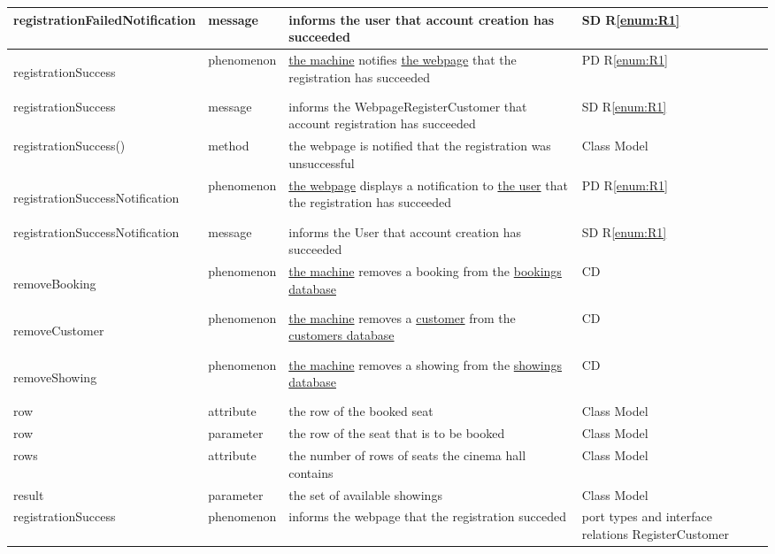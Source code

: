 \documentclass[a4paper,10pt,titlepage,bibtotoc,bibtotocnumbered]{scrreprt}
\begin{document}
\begin{longtable}{|p{.4\linewidth}|p{.2\linewidth}|p{.2\linewidth}|p{.2\linewidth}|}
\hline
registrationFailedNotification & message & informs the user that account creation has succeeded & SD R\ref{enum:R1}\\
\hline
\hypertarget{glossary:registrationSuccess}{registrationSuccess} & phenomenon & \hyperlink{glossary:UDEKino}{the machine} notifies \hyperlink{glossary:WebpageRegisterCustomer}{the webpage} that the registration has succeeded & PD R\ref{enum:R1}\\
\hline
registrationSuccess & message & informs the WebpageRegisterCustomer that account registration has succeeded & SD R\ref{enum:R1}\\
\hline
registrationSuccess() & method & the webpage is notified that the registration was unsuccessful & Class Model\\
\hline
\hypertarget{glossary:registrationSuccessNotification}{registrationSuccessNotification} & phenomenon & \hyperlink{glossary:WebpageRegisterCustomer}{the webpage} displays a notification to \hyperlink{glossary:User}{the user} that the registration has succeeded & PD R\ref{enum:R1}\\
\hline
registrationSuccessNotification & message & informs the User that account creation has succeeded & SD R\ref{enum:R1}\\
\hline
\hypertarget{glossary:removeBooking}{removeBooking} & phenomenon &  \hyperlink{glossary:UDEKino}{the machine} removes a booking from the \hyperlink{glossary:Booking}{bookings database} & CD\\
\hline
\hypertarget{glossary:removeBooking}{removeCustomer} & phenomenon &  \hyperlink{glossary:UDEKino}{the machine} removes a \hyperlink{glossary:Customer}{customer} from the \hyperlink{glossary:CustomerAccount}{customers database} & CD\\
\hline
\hypertarget{glossary:removeShowing}{removeShowing} & phenomenon &  \hyperlink{glossary:UDEKino}{the machine} removes a showing from the \hyperlink{glossary:Showing}{showings database} & CD\\
\hline
row & attribute & the row of the booked seat & Class Model\\
\hline
row & parameter & the row of the seat that is to be booked & Class Model\\
\hline
rows & attribute & the number of rows of seats the cinema hall contains & Class Model\\
\hline
result & parameter & the set of available showings & Class Model\\
\hline
registrationSuccess & phenomenon & informs the webpage that the registration succeded & port types and interface relations RegisterCustomer\\

\end{longtable}
\end{document}
